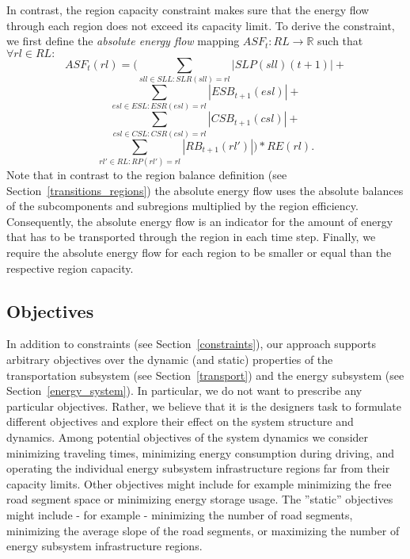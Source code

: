 In contrast, the region capacity constraint makes sure that the energy flow through each region does not exceed its capacity limit. To derive the constraint, we first define the \textit{absolute energy flow} mapping $ASF_t: RL \rightarrow \mathbb{R}$ such that $\forall rl \in RL:$
\[
	ASF_t(rl) = (\sum_{sll \in SLL: SLR(sll) = rl} |SLP(sll)(t+1)| +
\]
\[
	\sum_{esl \in ESL: ESR(esl) = rl} |ESB_{t+1}(esl)| +
\]
\[
	\sum_{csl \in CSL: CSR(csl) = rl} |CSB_{t+1}(csl)| +
\]
\[
	\sum_{rl' \in RL: RP(rl') = rl} |RB_{t+1}(rl')|) * RE(rl) \textrm{.}
\]
Note that in contrast to the region balance definition (see Section~\ref{transitions_regions}) the absolute energy flow uses the absolute balances of the subcomponents and subregions multiplied by the region efficiency. Consequently, the absolute energy flow is an indicator for the amount of energy that has to be transported through the region in each time step. Finally, we require the absolute energy flow for each region to be smaller or equal than the respective region capacity.

\subsection{Objectives}
\label{objectives}

In addition to constraints (see Section~\ref{constraints}), our approach supports arbitrary objectives over the dynamic (and static) properties of the transportation subsystem (see Section~\ref{transport}) and the energy subsystem (see Section~\ref{energy_system}). In particular, we do not want to prescribe any particular objectives. Rather, we believe that it is the designers task to formulate different objectives and explore their effect on the system structure and dynamics. Among potential objectives of the system dynamics we consider minimizing traveling times, minimizing energy consumption during driving, and operating the individual energy subsystem infrastructure regions far from their capacity limits. Other objectives might include for example minimizing the free road segment space or minimizing energy storage usage. The ''static'' objectives might include - for example - minimizing the number of road segments, minimizing the average slope of the road segments, or maximizing the number of energy subsystem infrastructure regions.